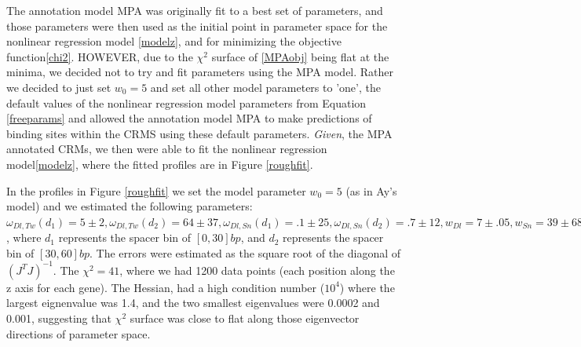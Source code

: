 The annotation model MPA was originally fit to a best set of parameters, and those parameters were then used as the initial point in parameter space for the nonlinear regression model \ref{modelz}, and for minimizing the objective function\ref{chi2}.  HOWEVER, due to the $\chi^2$ surface of \ref{MPAobj} being flat at the minima, we decided not to try and fit parameters using the MPA model. Rather we decided to just set $w_0 =5$ and set all other model parameters to 'one', the default values of the nonlinear regression model parameters from Equation \ref{freeparams} and allowed the annotation model MPA to make predictions of binding sites within the CRMS using these default parameters.  \emph{Given}, the MPA annotated CRMs, we then were able to fit the nonlinear regression model\ref{modelz}, where the fitted profiles are in Figure \ref{roughfit}.

In the profiles in Figure \ref{roughfit} we set the model parameter $w_0 =5$ (as in Ay's model) and we estimated the following parameters: $\omega_{Dl,Tw}(d_1)= 5\pm 2 , 	\omega_{Dl,Tw}(d_2) = 64\pm 37 , 	\omega_{Dl,Sn}(d_1)=.1 \pm 25 ,	\omega_{Dl,Sn}(d_2)=.7 \pm 12,	w_{Dl}=7 \pm .05	,w_{Sn}=39 \pm 687 $, where $d_1$ represents the spacer bin of $[0,30]bp$, and $d_2$ represents the spacer bin of $[30,60]bp$.  The errors were estimated as the square root of the diagonal of $(J^TJ)^{-1}$.  The $\chi^2=41$, where we had 1200 data points (each position along the z axis for each gene).  The Hessian, had a high condition number ($10^4$) where the largest eignenvalue was 1.4, and the two smallest eigenvalues were 0.0002 and 0.001, suggesting that $\chi^2$ surface was close to flat along those eigenvector directions of parameter space.



%	
%	
%

